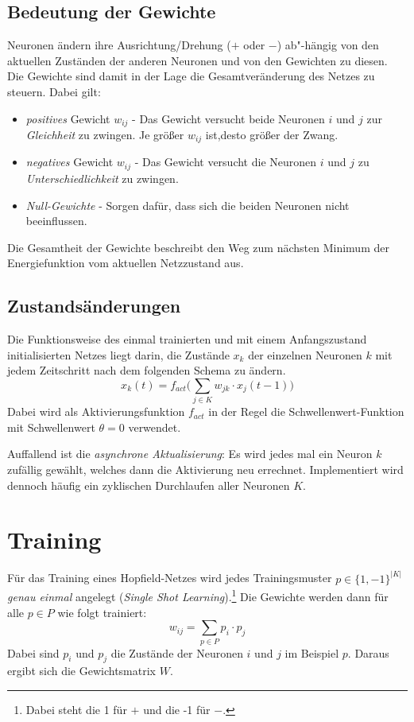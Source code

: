 \subsection*{Bedeutung der Gewichte}
Neuronen ändern ihre Ausrichtung/Drehung ($+$ oder $-$) ab"-hängig von den aktuellen Zuständen der anderen Neuronen und von den Gewichten zu diesen. Die Gewichte sind damit in der Lage die Gesamtveränderung des Netzes zu steuern.
Dabei gilt:
\begin{itemize}
	\item \emph{positives} Gewicht $w_{ij}$ - Das Gewicht versucht beide Neuronen $i$ und $j$ zur \emph{Gleichheit} zu zwingen. Je größer $w_{ij}$ ist,desto größer der Zwang.
	\item \emph{negatives} Gewicht $w_{ij}$ - Das Gewicht versucht die Neuronen $i$ und $j$ zu \emph{Unterschiedlichkeit} zu zwingen.
	\item \emph{Null-Gewichte} - Sorgen dafür, dass sich die beiden Neuronen nicht beeinflussen.
\end{itemize}

Die Gesamtheit der Gewichte beschreibt den Weg zum nächsten Minimum der Energiefunktion vom aktuellen Netzzustand aus.


\subsection*{Zustandsänderungen}
Die Funktionsweise des einmal trainierten und mit einem Anfangszustand initialisierten Netzes liegt darin, die Zustände $x_k$ der einzelnen Neuronen $k$ mit jedem Zeitschritt nach dem folgenden Schema zu ändern.
\[
	x_k(t) = f_{act}\Big( \sum_{j \in K} w_{jk} \cdot x_j(t-1) \Big)
\]
Dabei wird als Aktivierungsfunktion $f_{act}$ in der Regel die Schwellenwert-Funktion mit Schwellenwert $\theta = 0$ verwendet.

Auffallend ist die \emph{asynchrone Aktualisierung}: Es wird jedes mal ein Neuron $k$ zufällig gewählt, welches dann die Aktivierung neu errechnet. Implementiert wird dennoch häufig ein zyklischen Durchlaufen aller Neuronen $K$.




\section*{Training}
Für das Training eines Hopfield-Netzes wird jedes Trainingsmuster $p \in \{1,-1\}^{|K|}$ \emph{genau einmal} angelegt (\emph{Single Shot Learning}).\footnote{Dabei steht die 1 für $+$ und die -1 für $-$.}
Die Gewichte werden dann für alle $p \in P$ wie folgt trainiert:
\[
	w_{ij} = \sum_{p \in P} p_i \cdot p_j
\]
Dabei sind $p_i$ und $p_j$ die Zustände der Neuronen $i$ und $j$ im Beispiel $p$. Daraus ergibt sich die Gewichtsmatrix $W$.

